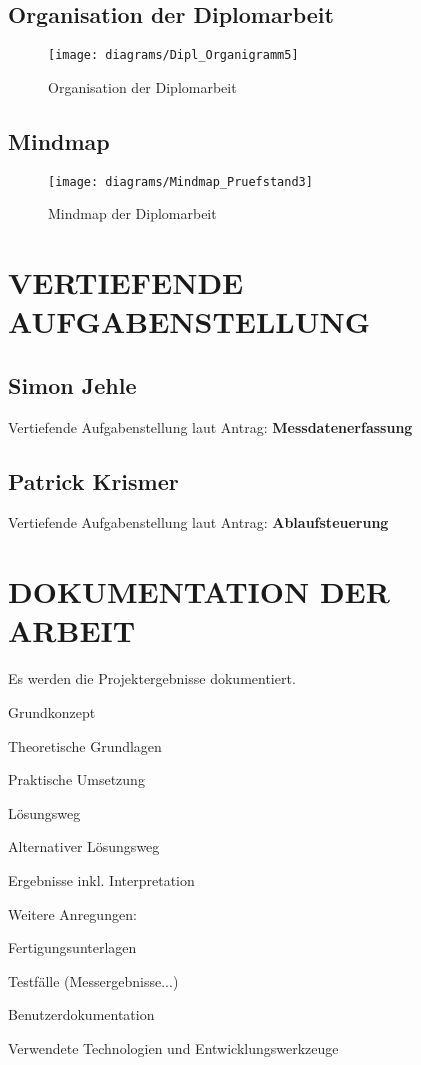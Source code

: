\documentclass[12pt,a4paper]{article}
\newcommand{\yhbu}[0]{\color{ydkbu}}	%
\begin{document}
\subsection{Organisation der Diplomarbeit}
\begin{figure}[h!]
	\centering
	\texttt{[image: diagrams/Dipl\_Organigramm5]}
	\caption{Organisation der Diplomarbeit}
\end{figure}
%
%
\newpage
\subsection{Mindmap}
\begin{figure}[h!]
	\centering
	\texttt{[image: diagrams/Mindmap\_Pruefstand3]}
	\caption{Mindmap der Diplomarbeit}
\end{figure}
%
%
\newpage
\section{VERTIEFENDE AUFGABENSTELLUNG}
 \subsection{Simon Jehle}
Vertiefende Aufgabenstellung laut Antrag: {\bf Messdatenerfassung}
%
 \subsection{Patrick Krismer}
Vertiefende Aufgabenstellung laut Antrag: {\bf Ablaufsteuerung}
%
%
\newpage
\section{DOKUMENTATION DER ARBEIT}
   {\yhbu
	Es werden die Projektergebnisse dokumentiert.
	\begin{itemize*}
	\item	Grundkonzept
	\item	Theoretische Grundlagen
	\item	Praktische Umsetzung
	\item	Lösungsweg
	\item	Alternativer Lösungsweg
	\item	Ergebnisse inkl. Interpretation
	\end{itemize*}
	Weitere Anregungen:
	\begin{itemize*}
	\item	Fertigungsunterlagen
	\item	Testfälle (Messergebnisse...)
	\item	Benutzerdokumentation
	\item	Verwendete Technologien und Entwicklungswerkzeuge
	\end{itemize*}
   }%
%
%
\newpage
\end{document}
